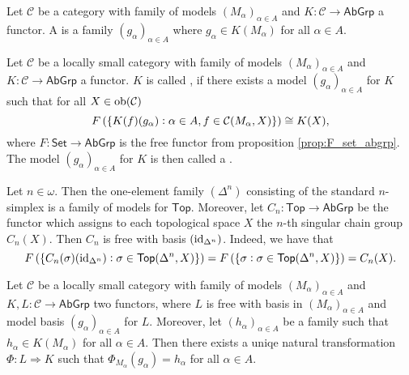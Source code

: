 \begin{definition}[$K$-Models]
	Let $\mathcal{C}$ be a category with family of models $(M_\alpha)_{\alpha \in A}$ and $K : \mathcal{C} \to \mathsf{AbGrp}$ a functor. A  is a family $(g_\alpha)_{\alpha \in A}$ where $g_\alpha \in K(M_\alpha)$ for all $\alpha \in A$.
\end{definition}

\begin{definition}
	Let $\mathcal{C}$ be a locally small category with family of models $(M_\alpha)_{\alpha \in A}$ and $K : \mathcal{C} \to \mathsf{AbGrp}$ a functor. $K$ is called , if there exists a model $(g_\alpha)_{\alpha \in A}$ for $K$ such that for all $X \in \operatorname{ob}(\mathcal{C})$
	\begin{equation}
		F\del[0]{\cbr[0]{K(f)(g_\alpha) : \alpha \in A, f \in \mathcal{C}(M_\alpha,X)}} \cong K(X),
	\end{equation}
	\noindent where $F : \mathsf{Set} \to \mathsf{AbGrp}$ is the free functor from proposition \ref{prop:F_set_abgrp}. The model $(g_\alpha)_{\alpha \in A}$ for $K$ is then called a .
\end{definition}

\begin{example}
	Let $n \in \omega$. Then the one-element family $(\Delta^n)$ consisting of the standard $n$-simplex is a family of models for $\mathsf{Top}$. Moreover, let $C_n : \mathsf{Top} \to \mathsf{AbGrp}$ be the functor which assigns to each topological space $X$ the $n$-th singular chain group $C_n(X)$. Then $C_n$ is free with basis $(\operatorname{id}_{\Delta^n})$. Indeed, we have that
\begin{equation*}
	F\del[0]{\cbr[0]{C_n(\sigma)(\id_{\Delta^n}) : \sigma \in \mathsf{Top}(\Delta^n,X)}} = F\del[0]{\cbr[0]{\sigma : \sigma \in \mathsf{Top}(\Delta^n,X)}} = C_n(X).
\end{equation*}
\end{example}

\begin{proposition}
	Let $\mathcal{C}$ be a locally small category with family of models $(M_\alpha)_{\alpha \in A}$ and $K,L : \mathcal{C} \to \mathsf{AbGrp}$ two functors, where $L$ is free with basis in $(M_\alpha)_{\alpha \in A}$ and model basis $(g_\alpha)_{\alpha \in A}$ for $L$. Moreover, let $(h_\alpha)_{\alpha \in A}$ be a family such that $h_\alpha \in K(M_\alpha)$ for all $\alpha \in A$. Then there exists a uniqe natural transformation $\Phi : L \Rightarrow K$ such that $\Phi_{M_\alpha}(g_\alpha) = h_\alpha$ for all $\alpha \in A$.
\end{proposition}


